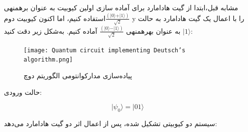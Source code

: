 \documentclass{book}
\begin{document}
مشابه قبل،‌ابتدا از گیت هادامارد برای آماده سازی اولین کیوبیت به عنوان برهمنهی $\frac{(\vert 0 \rangle + \vert 1 \rangle)}{\sqrt{2}}$استفاده کنیم، اما اکنون کیوبیت دوم y را با اعمال یک گیت هادامارد به حالت $\vert 1 \rangle$ به عنوان بهرهمنهی $\frac{(\vert 0 \rangle - \vert 1 \rangle)}{\sqrt{2}}$ آماده کنیم. به‌شکل زیر دقت کنید:



\begin{figure}[ht]
	\centering
	\texttt{[image: Quantum circuit implementing Deutsch’s algorithm.png]}
	\caption{پیاده‌سازی مدارکوانتومی‌ الگوریتم دوچ}
\end{figure}

\newpage

حالت ورودی:\\
\begin{center}
	\begin{equation}\label{zero state deutsch}
		\vert\psi_{0}\rangle = \vert01\rangle
	\end{equation}
\end{center}

سیستم دو کیوبیتی تشکیل شده،‌ پس از اعمال اثر دو گیت هادامارد می‌دهد:\\
\end{document}

